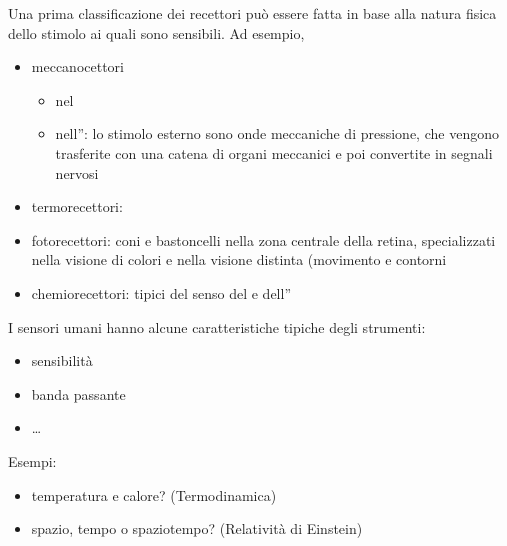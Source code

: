 \documentclass[letterpaper,10pt,italian]{jupyterBook}
\begin{document}
\sphinxAtStartPar
Una prima classificazione dei recettori può essere fatta in base alla natura fisica dello stimolo ai quali sono sensibili. Ad esempio,
\begin{itemize}
\item {} 
\sphinxAtStartPar
meccanocettori
\begin{itemize}
\item {} 
\sphinxAtStartPar
nel 

\item {} 
\sphinxAtStartPar
nell”: lo stimolo esterno sono onde meccaniche di pressione, che vengono trasferite con una catena di organi meccanici e poi convertite in segnali nervosi

\end{itemize}

\item {} 
\sphinxAtStartPar
termorecettori:

\item {} 
\sphinxAtStartPar
fotorecettori: coni e bastoncelli nella zona centrale della retina, specializzati nella visione di colori e nella visione distinta (movimento e contorni

\item {} 
\sphinxAtStartPar
chemiorecettori: tipici del senso del  e dell”

\end{itemize}

\sphinxAtStartPar
I sensori umani hanno alcune caratteristiche tipiche degli strumenti:
\begin{itemize}
\item {} 
\sphinxAtStartPar
sensibilità

\item {} 
\sphinxAtStartPar
banda passante

\item {} 
\sphinxAtStartPar
…

\end{itemize}

\sphinxAtStartPar
Esempi:
\begin{itemize}
\item {} 
\sphinxAtStartPar
temperatura e calore? (Termodinamica)

\item {} 
\sphinxAtStartPar
spazio, tempo o spazio\sphinxhyphen{}tempo? (Relatività di Einstein)

\end{itemize}
\end{document}
